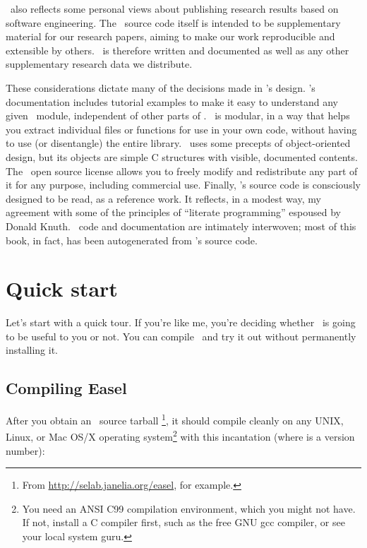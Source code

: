 \Easel\ also reflects some personal views about publishing research
results based on software engineering. The \Easel\ source code itself
is intended to be supplementary material for our research papers,
aiming to make our work reproducible and extensible by others.
\Easel\ is therefore written and documented as well as any other
supplementary research data we distribute.

These considerations dictate many of the decisions made in \Easel's
design.  \Easel's documentation includes tutorial examples to make it
easy to understand any given \Easel\ module, independent of other
parts of \Easel.  \Easel\ is modular, in a way that helps you extract
individual files or functions for use in your own code, without having
to use (or disentangle) the entire library. \Easel\ uses some precepts
of object-oriented design, but its objects are simple C structures
with visible, documented contents. The \Easel\ open source license
allows you to freely modify and redistribute any part of it for any
purpose, including commercial use. Finally, \Easel's source code is
consciously designed to be read, as a reference work. It reflects, in
a modest way, my agreement with some of the principles of ``literate
programming'' espoused by Donald Knuth. \Easel\ code and documentation
are intimately interwoven; most of this book, in fact, has been
autogenerated from \Easel's source code.

\section{Quick start}

Let's start with a quick tour. If you're like me, you're deciding
whether \Easel\ is going to be useful to you or not. You can compile
\Easel\ and try it out without permanently installing it.

\subsection{Compiling Easel}

After you obtain an \Easel\ source tarball
\footnote{From \url{http://selab.janelia.org/easel}, for example.}, it
should compile cleanly on any UNIX, Linux, or Mac OS/X operating
system\footnote{You need an ANSI C99 compilation environment, which you might
not have. If not, install a C compiler first, such as the free GNU gcc
compiler, or see your local system guru.} with this incantation (where
 is a version number):

